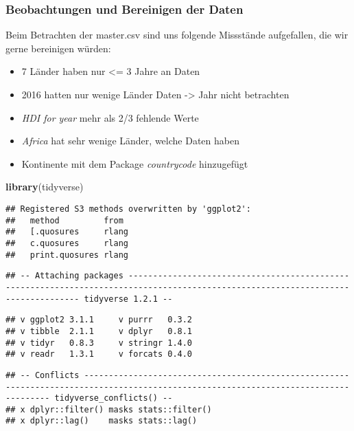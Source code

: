 \documentclass[]{article}
\newenvironment{Shaded}{\begin{snugshade}}{\end{snugshade}}
\newcommand{\KeywordTok}[1]{\textcolor[rgb]{0.13,0.29,0.53}{\textbf{#1}}}
\newcommand{\NormalTok}[1]{#1}
\providecommand{\tightlist}{%
  \setlength{\itemsep}{0pt}\setlength{\parskip}{0pt}}
\begin{document}
\hypertarget{beobachtungen-und-bereinigen-der-daten}{%
\subsubsection{Beobachtungen und Bereinigen der
Daten}\label{beobachtungen-und-bereinigen-der-daten}}

Beim Betrachten der master.csv sind uns folgende Missstände aufgefallen,
die wir gerne bereinigen würden:

\begin{itemize}
\tightlist
\item
  7 Länder haben nur \textless{}= 3 Jahre an Daten
\item
  2016 hatten nur wenige Länder Daten -\textgreater{} Jahr nicht
  betrachten
\item
  \emph{HDI for year} mehr als 2/3 fehlende Werte
\item
  \emph{Africa} hat sehr wenige Länder, welche Daten haben
\item
  Kontinente mit dem Package \emph{countrycode} hinzugefügt
\end{itemize}

\begin{Shaded}
\begin{Highlighting}[]
\KeywordTok{library}\NormalTok{(tidyverse)}
\end{Highlighting}
\end{Shaded}

\begin{verbatim}
## Registered S3 methods overwritten by 'ggplot2':
##   method         from 
##   [.quosures     rlang
##   c.quosures     rlang
##   print.quosures rlang
\end{verbatim}

\begin{verbatim}
## -- Attaching packages ---------------------------------------------------------------------------------------------------------------------------------- tidyverse 1.2.1 --
\end{verbatim}

\begin{verbatim}
## v ggplot2 3.1.1     v purrr   0.3.2
## v tibble  2.1.1     v dplyr   0.8.1
## v tidyr   0.8.3     v stringr 1.4.0
## v readr   1.3.1     v forcats 0.4.0
\end{verbatim}

\begin{verbatim}
## -- Conflicts ------------------------------------------------------------------------------------------------------------------------------------- tidyverse_conflicts() --
## x dplyr::filter() masks stats::filter()
## x dplyr::lag()    masks stats::lag()
\end{verbatim}
\end{document}
